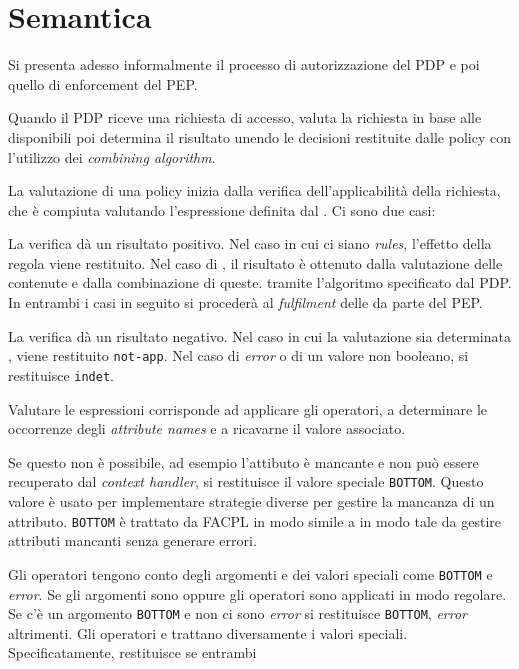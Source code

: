 \section{Semantica }
\label{sec:Semantica }
Si presenta adesso informalmente il processo di autorizzazione del PDP e poi quello di enforcement del PEP.\par
Quando il PDP riceve una richiesta di accesso, valuta la richiesta in base alle \epolicy disponibili poi determina
il risultato unendo le decisioni restituite dalle policy con l'utilizzo dei \emph{combining algorithm}.\par
La valutazione di una policy inizia dalla verifica dell'applicabilità della richiesta, che è compiuta valutando
l'espressione definita dal \etarget. Ci sono due casi:
\begin{description}
  \item La verifica dà un risultato positivo. Nel caso in cui ci siano \emph{rules}, l'effetto della regola viene restituito.
        Nel caso di \ePolicySet, il risultato è ottenuto dalla valutazione delle \epolicy contenute e dalla combinazione di queste.
        tramite l'algoritmo specificato dal PDP. In entrambi i casi in seguito si procederà al \emph{fulfilment} delle
        \eobligation da parte del PEP.
  \item La verifica dà un risultato negativo. Nel caso in cui la valutazione sia determinata \efalse, viene restituito
        \texttt{not-app}. Nel caso di \emph{error} o di un valore non booleano, si restituisce \texttt{indet}.
\end{description}
Valutare le espressioni corrisponde ad applicare gli operatori, a determinare le occorrenze degli \emph{attribute names} e
a ricavarne il valore associato.\par
Se questo non è possibile, ad esempio l'attibuto è mancante e non può essere recuperato dal \emph{context handler}, si
restituisce il valore speciale \texttt{BOTTOM}. Questo valore è usato per implementare strategie diverse per gestire
la mancanza di un attributo. \texttt{BOTTOM} è trattato da FACPL in modo simile a \efalse in modo tale da gestire
attributi mancanti senza generare errori.\par
Gli operatori tengono conto degli argomenti e dei valori speciali come \texttt{BOTTOM} e \emph{error}.
Se gli argomenti sono \etrue oppure \efalse gli operatori sono applicati in modo regolare.
Se c'è un argomento \texttt{BOTTOM} e non ci sono \emph{error} si restituisce \texttt{BOTTOM}, \emph{error} altrimenti.
Gli operatori \eand e \eor trattano diversamente i valori speciali. Specificatamente, \eand restituisce \etrue se entrambi
